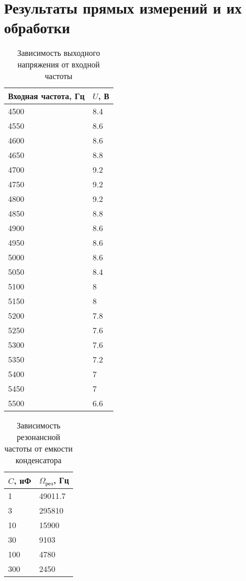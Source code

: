 \section{Результаты прямых измерений и их обработки}
\begin{table}[H]
	\centering
	\begin{tabular}{|l|l|}
		\hline
		Входная частота, Гц & $U$, В \\
		\hline
		4500                & 8.4    \\
		\hline
		4550                & 8.6    \\
		\hline
		4600                & 8.6    \\
		\hline
		4650                & 8.8    \\
		\hline
		4700                & 9.2    \\
		\hline
		4750                & 9.2    \\
		\hline
		4800                & 9.2    \\
		\hline
		4850                & 8.8    \\
		\hline
		4900                & 8.6    \\
		\hline
		4950                & 8.6    \\
		\hline
		5000                & 8.6    \\
		\hline
		5050                & 8.4    \\
		\hline
		5100                & 8      \\
		\hline
		5150                & 8      \\
		\hline
		5200                & 7.8    \\
		\hline
		5250                & 7.6    \\
		\hline
		5300                & 7.6    \\
		\hline
		5350                & 7.2    \\
		\hline
		5400                & 7      \\
		\hline
		5450                & 7      \\
		\hline
		5500                & 6.6    \\
		\hline
	\end{tabular}
	\caption{Зависимость выходного напряжения от входной частоты}
\end{table}

\begin{table}[H]
	\centering
	\begin{tabular}{|l|l|}
		\hline
		\(C\), нФ & \(\Omega_\text{рез}\), Гц \\
		\hline
		1         & 49011.7                   \\
		\hline
		3         & 295810                    \\
		\hline
		10        & 15900                     \\
		\hline
		30        & 9103                      \\
		\hline
		100       & 4780                      \\
		\hline
		300       & 2450                      \\
		\hline
	\end{tabular}
	\caption{Зависимость резонансной частоты от емкости конденсатора}
\end{table}


